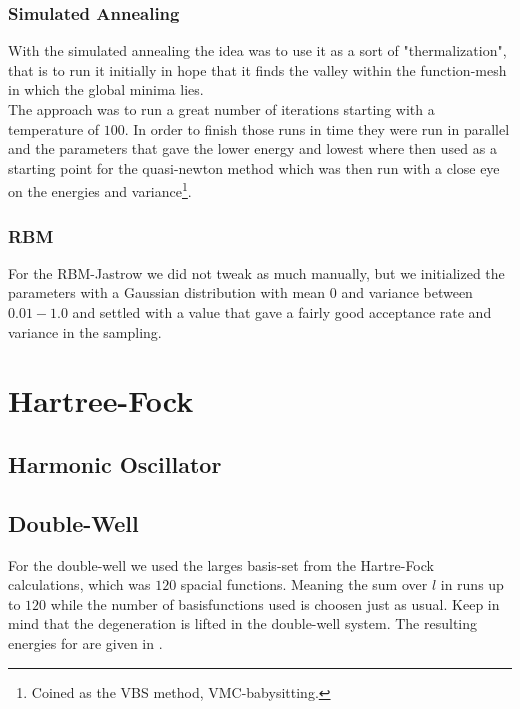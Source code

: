 \subsubsection{Simulated Annealing}
    With the simulated annealing the idea was to use it as a sort of
    "thermalization", that is to run it initially in hope that it finds the
    valley within the function-mesh in which the global minima lies. \\ 
    The approach was to run a great number of iterations starting with a
    temperature of $100$. In order to finish those runs in time they were run
    in parallel and the parameters that gave the lower energy and lowest where
    then used as a starting point for the quasi-newton method which was then
    run with a close eye on the energies and variance\footnote{Coined as the
    VBS method, VMC-babysitting.}.

\subsubsection{RBM}
    For the RBM-Jastrow we did not tweak as much manually, but we initialized
    the parameters with a Gaussian distribution with mean $0$ and variance
    between $0.01-1.0$ and settled with a value that gave a fairly good
    acceptance rate and variance in the sampling.

\section{Hartree-Fock}
\subsection{Harmonic Oscillator}
    
    

\subsection{Double-Well\label{sec:dwbimp}}
    For the double-well we used the larges basis-set from the Hartre-Fock
    calculations, which was $120$ spacial functions. Meaning the sum over $l$
    in  runs up to $120$ while the number of
    basisfunctions used is choosen just as usual. Keep in mind that the
    degeneration is lifted in the double-well system. The resulting energies
    for are given in .
    
    

